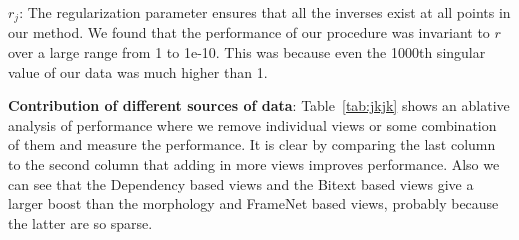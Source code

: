 \documentclass[11pt]{article}
\begin{document}
$r_j$: The regularization parameter ensures that all the
  inverses exist at all points in our method. We found that the
  performance of our  procedure was invariant to $r$ over a large
  range from 1 to 1e-10. This was because even the 1000th singular
  value of  our data was much higher than 1.

\noindent\textbf{Contribution of different sources of data}:
 Table~\ref{tab:jkjk} shows an ablative analysis of performance where we
 remove individual views or some combination of them and measure the
 performance.  It is clear by comparing the last column to the second
 column that adding in more views 
 improves performance. Also we can see that the Dependency based views and the Bitext
 based views give a larger boost than the morphology and FrameNet
 based views, probably because the latter are so sparse.
\end{document}
